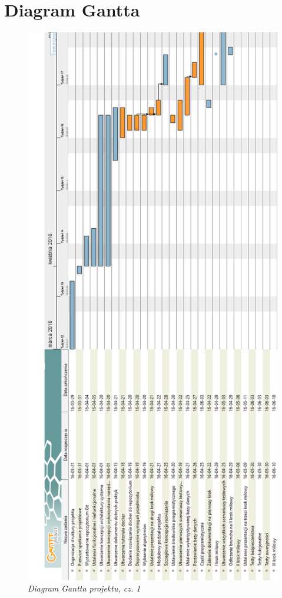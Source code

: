 \chapter{Diagram Gantta}
\label{ap:2}

\begin{figure}[!h]
    \begin{center}
    \includegraphics[angle=0,scale=0.4]{img/gantt1.png}
    \end{center}
    \caption{\em Diagram Gantta projektu, cz. 1}
    \label{fig:g1}
\end{figure}


